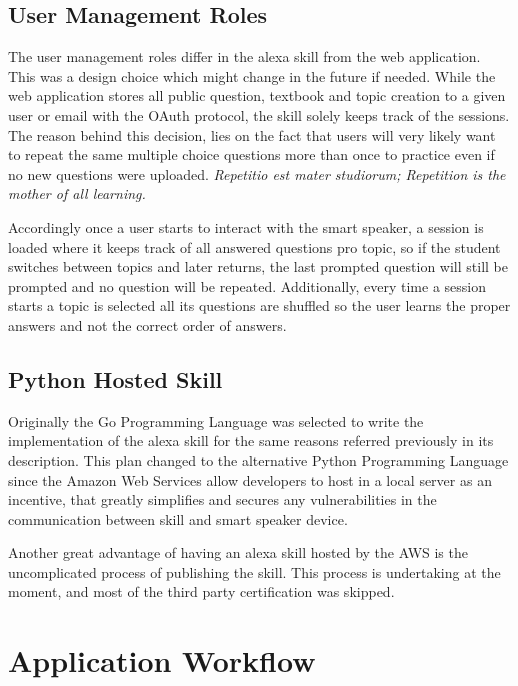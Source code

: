 \subsection{User Management Roles}

The user management roles differ in the alexa skill from the web application.
This was a design choice which might change in the future if needed. While
the web application stores all public question, textbook and topic creation to
a given user or email with the OAuth protocol, the skill solely keeps track
of the sessions. The reason behind this decision, lies on the fact that 
users will very likely want to repeat the same multiple choice questions more 
than once to practice even if no new questions were uploaded. \textit{Repetitio 
est mater studiorum; Repetition is the mother of all learning.}

Accordingly once a user starts to interact with the smart speaker, a session is
loaded where it keeps track of all answered questions pro topic, so if the student
switches between topics and later returns, the last prompted question will still be prompted
and no question will be repeated. Additionally, every time a session starts a topic
is selected all its questions are shuffled so the user learns the proper answers
and not the correct order of answers.

\subsection{Python Hosted Skill}

Originally the Go Programming Language was selected to write the implementation 
of the alexa skill for the same reasons referred previously in its description.
This plan changed to the alternative Python Programming Language since the 
Amazon Web Services allow developers to host in a local server as an incentive, 
that greatly simplifies and secures any vulnerabilities in the communication
between skill and smart speaker device.

Another great advantage of having an alexa skill hosted by the AWS is the 
uncomplicated process of publishing the skill. This process is undertaking at the 
moment, and most of the third party certification was skipped.



\section{Application Workflow}

